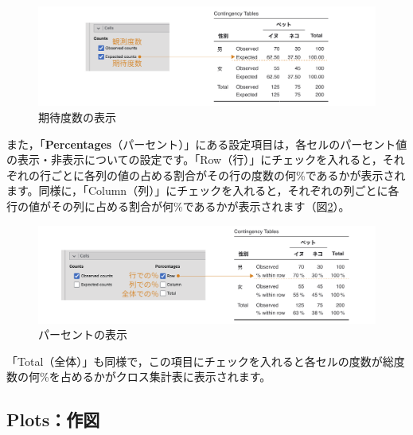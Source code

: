 \documentclass[
  12pt,
  a5jpaper,
  lualatex, ja=standard]{bxjsbook}
\begin{document}
\begin{figure}[!ht]

{\centering \includegraphics[width=1\linewidth]{images/frequencies/chisq-cells-expected} 

}

\caption{期待度数の表示}\label{fig:frequencies-chisq-cells-expected}
\end{figure}

また，「\textbf{Percentages}（パーセント）」にある設定項目は，各セルのパーセント値の表示・非表示についての設定です。「Row（行）」にチェックを入れると，それぞれの行ごとに各列の値の占める割合がその行の度数の何\%であるかが表示されます。同様に，「Column（列）」にチェックを入れると，それぞれの列ごとに各行の値がその列に占める割合が何\%であるかが表示されます（図\ref{fig:frequencies-chisq-cells-percentage}）。

\begin{figure}[!ht]

{\centering \includegraphics[width=1\linewidth]{images/frequencies/chisq-cells-percentage} 

}

\caption{パーセントの表示}\label{fig:frequencies-chisq-cells-percentage}
\end{figure}

「Total（全体）」も同様で，この項目にチェックを入れると各セルの度数が総度数の何\%を占めるかがクロス集計表に表示されます。

\hypertarget{sub:frequencies-chisq-plots}{%
\subsection{Plots：作図}\label{sub:frequencies-chisq-plots}}
\end{document}
